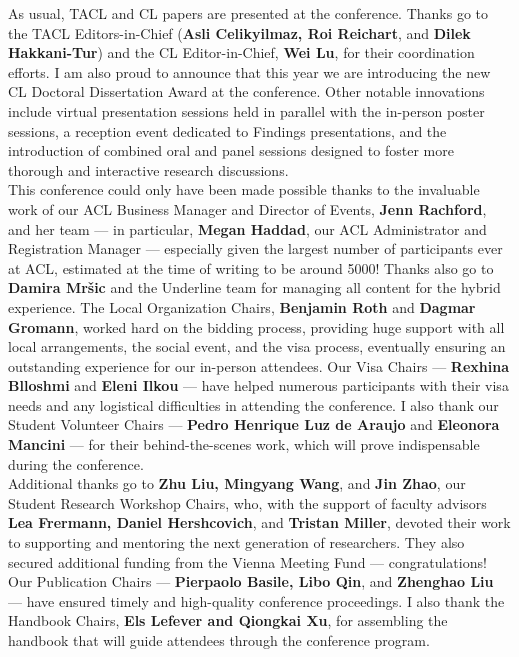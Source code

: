 As usual, TACL and CL papers are presented at the conference. Thanks go to the TACL Editors-in-Chief (\textbf{Asli Celikyilmaz, Roi Reichart}, and \textbf{Dilek Hakkani-Tur}) and the CL Editor-in-Chief, \textbf{Wei Lu}, for their coordination efforts. I am also proud to announce that this year we are introducing the new CL Doctoral Dissertation Award at the conference. Other notable innovations include virtual presentation sessions held in parallel with the in-person poster sessions, a reception event dedicated to Findings presentations, and the introduction of combined oral and panel sessions designed to foster more thorough and interactive research discussions.\\


This conference could only have been made possible thanks to the invaluable work of our ACL Business Manager and Director of Events, \textbf{Jenn Rachford}, and her team --- in particular, \textbf{Megan Haddad}, our ACL Administrator and Registration Manager --- especially given the largest number of participants ever at ACL, estimated at the time of writing to be around 5000! Thanks also go to \textbf{Damira Mršic} and the Underline team for managing all content for the hybrid experience. The Local Organization Chairs, \textbf{Benjamin Roth} and \textbf{Dagmar Gromann}, worked hard on the bidding process, providing huge support with all local arrangements, the social event, and the visa process, eventually ensuring an outstanding experience for our in-person attendees. Our Visa Chairs --- \textbf{Rexhina Blloshmi} and \textbf{Eleni Ilkou} --- have helped numerous participants with their visa needs and any logistical difficulties in attending the conference. I also thank our Student Volunteer Chairs --- \textbf{Pedro Henrique Luz de Araujo} and \textbf{Eleonora Mancini} --- for their behind-the-scenes work, which will prove indispensable during the conference. \\


Additional thanks go to \textbf{Zhu Liu, Mingyang Wang}, and \textbf{Jin Zhao}, our Student Research Workshop Chairs, who, with the support of faculty advisors \textbf{Lea Frermann, Daniel Hershcovich}, and \textbf{Tristan Miller}, devoted their work to supporting and mentoring the next generation of researchers. They also secured additional funding from the Vienna Meeting Fund --- congratulations!\\


Our Publication Chairs --- \textbf{Pierpaolo Basile, Libo Qin}, and \textbf{Zhenghao Liu} --- have ensured timely and high-quality conference proceedings. I also thank the Handbook Chairs, \textbf{Els Lefever and Qiongkai Xu}, for assembling the handbook that will guide attendees through the conference program.\\


